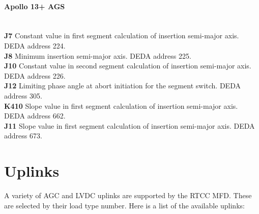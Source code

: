 \documentclass[11pt]{article} %
\begin{document}
\paragraph{Apollo 13+ AGS}\mbox{} \\
\textbf{J7} Constant value in first segment calculation of insertion semi-major axis. DEDA address 224.\\
\textbf{J8} Minimum insertion semi-major axis. DEDA address 225.\\
\textbf{J10} Constant value in second segment calculation of insertion semi-major axis. DEDA address 226.\\
\textbf{J12} Limiting phase angle at abort initiation for the segment switch. DEDA address 305.\\
\textbf{K410} Slope value in first segment calculation of insertion semi-major axis. DEDA address 662.\\
\textbf{J11} Slope value in first segment calculation of insertion semi-major axis. DEDA address 673.\\
\newpage
\section{Uplinks}
A variety of AGC and LVDC uplinks are supported by the RTCC MFD.  These are selected by their load type number. Here is a list of the available uplinks:\\
\end{document}
